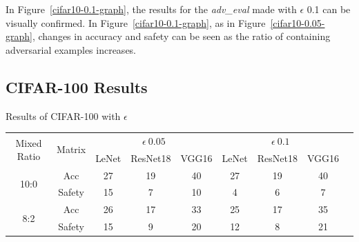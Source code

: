 \documentclass[journal,article,submit,moreauthors,pdftex]{Definitions/mdpi}
\begin{document}
In Figure~\ref{cifar10-0.1-graph}, the results for the {\it adv\_eval} made with \begin{math}\epsilon\end{math} 0.1 can be visually confirmed.
In Figure~\ref{cifar10-0.1-graph}, as in Figure~\ref{cifar10-0.05-graph}, changes in accuracy and safety can be seen as the ratio of containing adversarial examples increases.

\subsection{CIFAR-100 Results}

\begin{specialtable}[H]
    \centering
    \caption{Results of CIFAR-100 with \begin{math}\epsilon\end{math}}
    \label{cifar100-results}
    {\small
    \begin{tabular}{|c|c|c|c|c|c|c|c|c|}
    \hline
    \multirow{2}{*}{Mixed Ratio} & \multirow{2}{*}{Matrix} & \multicolumn{3}{c|}{\begin{math}\epsilon \ 0.05\end{math}}  & \multicolumn{3}{c|}{\begin{math}\epsilon \ 0.1\end{math}}       \\ \cline{3-8}
                                 &                           & LeNet               & ResNet18              & VGG16       & LeNet              & ResNet18              & VGG16              \\ \hline 
    \multirow{2}{*}{10:0}        & Acc                       & 27                  & 19                    & 40          & 27                 & 19                    & 40                 \\ \cline{2-8} 
                                 & Safety                    & 15                  & 7                     & 10          & 4                  & 6                     & 7                  \\ \hline 
    \multirow{2}{*}{8:2}         & Acc                       & 26                  & 17                    & 33          & 25                 & 17                    & 35                 \\ \cline{2-8} 
                                 & Safety                    & 15                  & 9                     & 20          & 12                 & 8                     & 21                 \\ \hline 

\end{tabular}}
\end{specialtable}
\end{document}

